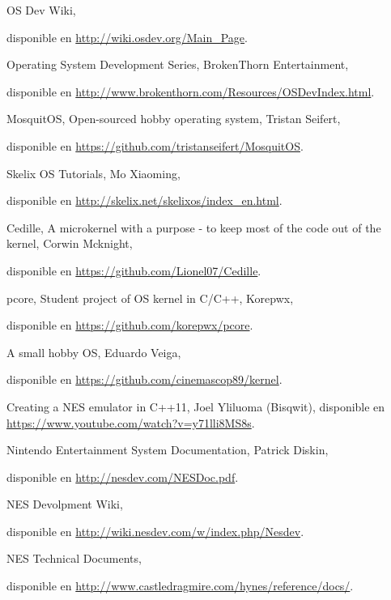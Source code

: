 \begin{thebibliography}{9}

\bibitem{}
  OS Dev Wiki,
  
  disponible en \url{http://wiki.osdev.org/Main_Page}.
 
\bibitem{}
  Operating System Development Series,
  BrokenThorn Entertainment,
  
  disponible en \url{http://www.brokenthorn.com/Resources/OSDevIndex.html}.

\bibitem{}
  MosquitOS,
  Open-sourced hobby operating system,
  Tristan Seifert,
  
  disponible en \url{https://github.com/tristanseifert/MosquitOS}.
  
\bibitem{}
  Skelix OS Tutorials,
  Mo Xiaoming,
  
  disponible en \url{http://skelix.net/skelixos/index_en.html}.
 
\bibitem{}
  Cedille,
  A microkernel with a purpose - to keep most of the code out of the kernel,
  Corwin Mcknight,
  
  disponible en \url{https://github.com/Lionel07/Cedille}.
  
\bibitem{}
  pcore,
  Student project of OS kernel in C/C++,
  Korepwx,
  
  disponible en \url{https://github.com/korepwx/pcore}.

\bibitem{}
  A small hobby OS,
  Eduardo Veiga,
  
  disponible en \url{https://github.com/cinemascop89/kernel}.


\bibitem{}
  Creating a NES emulator in C++11,
  Joel Yliluoma (Bisqwit),
  disponible en \url{https://www.youtube.com/watch?v=y71lli8MS8s}.

  Nintendo Entertainment System Documentation,
  Patrick Diskin,
  
  disponible en \url{http://nesdev.com/NESDoc.pdf}.
  
\bibitem{}
  NES Devolpment Wiki,
  
  disponible en \url{http://wiki.nesdev.com/w/index.php/Nesdev}.
  
  NES Technical Documents,
  
  disponible en \url{http://www.castledragmire.com/hynes/reference/docs/}.



\end{thebibliography}
